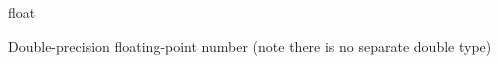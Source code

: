 \documentclass[
  letterpaper,
  DIV=11,
  numbers=noendperiod]{scrreprt}
\begin{document}
\begin{table}
\begin{minipage}[t]{\linewidth}
{\centering 

}

\end{minipage}%
\newline
\begin{minipage}[t]{\linewidth}

{\centering 

}

\end{minipage}%
\newline
\begin{minipage}[t]{\linewidth}

{\centering 

}

\end{minipage}%
\newline
\begin{minipage}[t]{\linewidth}

{\centering 

}

\end{minipage}%
\newline
\begin{minipage}[t]{\linewidth}

{\centering 

float

}

\end{minipage}%
\newline
\begin{minipage}[t]{\linewidth}

{\centering 

}

\end{minipage}%
\newline
\begin{minipage}[t]{\linewidth}

{\centering 

}

\end{minipage}%
\newline
\begin{minipage}[t]{\linewidth}

{\centering 

Double-precision floating-point number (note there is no separate double
type)

}

\end{minipage}%
\newline
\begin{minipage}[t]{\linewidth}


\end{minipage}
\end{table}
\end{document}
